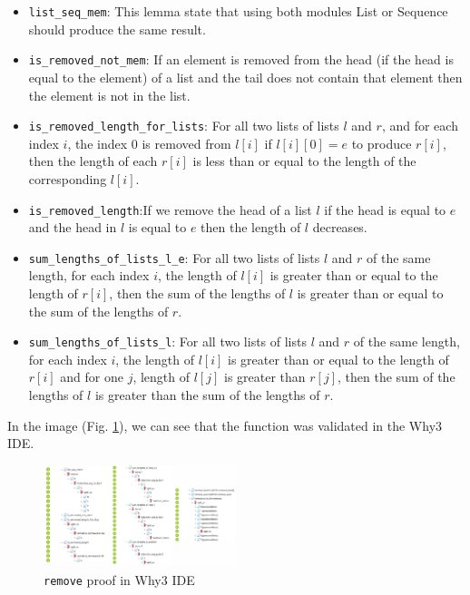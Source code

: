 \documentclass[runningheads]{llncs}
\begin{document}
\begin{itemize}
  \item \texttt{list\_seq\_mem}: This lemma state that using both modules List or Sequence should produce the same result.
  \item \texttt{is\_removed\_not\_mem}: If an element is removed from the head (if the head is equal to the element) of a list and the tail does not contain that element then the element is not in the list.
  \item \texttt{is\_removed\_length\_for\_lists}: For all two lists of lists $l$ and $r$, and for each index $i$, the index $0$ is removed from $l[i]$ if $l[i][0] = e$ to produce $r[i]$, then the length of each $r[i]$ is less than or equal to the length of the corresponding $l[i]$.
  \item \texttt{is\_removed\_length}:If we remove the head of a list $l$ if the head is equal to $e$ and the head in $l$ is equal to $e$ then the length of $l$ decreases.
  \item \texttt{sum\_lengths\_of\_lists\_l\_e}: For all two lists of lists $l$ and $r$ of the same length, for each index $i$, the length of $l[i]$ is greater than or equal to the length of $r[i]$, then the sum of the lengths of $l$ is greater than or equal to the sum of the lengths of $r$.
  \item \texttt{sum\_lengths\_of\_lists\_l}: For all two lists of lists $l$ and $r$ of the same length, for each index $i$, the length of $l[i]$ is greater than or equal to the length of $r[i]$ and for one $j$, length of $l[j]$ is greater than $r[j]$, then the sum of the lengths of $l$ is greater than the sum of the lengths of $r$.
\end{itemize}
In the image (Fig. \ref{fig:Why3Remove}), we can see that the function was validated in the Why3 IDE.
\begin{figure}[htbp]
  \centering
  \includegraphics[width=0.5\textwidth]{images/removeWhy3IDE.png}
  \caption{\texttt{remove} proof in Why3 IDE}
  \label{fig:Why3Remove} 
\end{figure}
\end{document}
